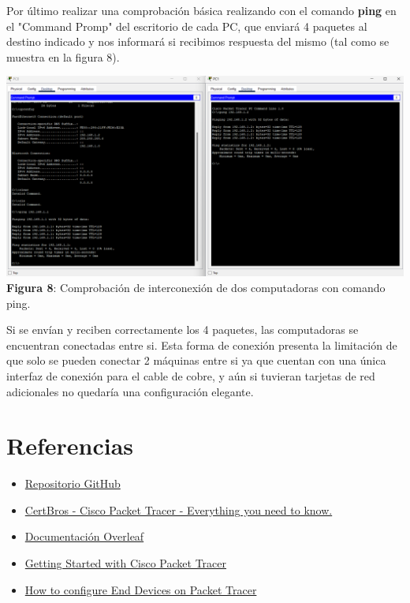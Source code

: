 \documentclass{article}
\begin{document}
    Por último realizar una comprobación básica realizando con el comando {\bfseries ping} en el "Command Promp" del escritorio de cada PC, que enviará 4 paquetes al destino indicado y nos informará si recibimos respuesta del mismo (tal como se muestra en la figura 8).
    \begin{center}
        \includegraphics[width=0.9\linewidth]{img_11} 
        \linebreak
        \small {\bfseries Figura 8}: Comprobación de interconexión de dos computadoras con comando ping.
    \end{center}
    Si se envían y reciben correctamente los 4 paquetes, las computadoras se encuentran conectadas entre si.\linebreak
    Esta forma de conexión presenta la limitación de que solo se pueden conectar 2 máquinas entre si ya que cuentan con una única interfaz de conexión para el cable de cobre, y aún si tuvieran tarjetas de red adicionales no quedaría una configuración elegante.
    
    \pagebreak
    \section{Referencias}
        \begin{itemize}
            \item \href{https://github.com/MarianC312/Introduccion_Packet_Tracer}{Repositorio GitHub}
            \item \href{https://www.youtube.com/watch?v=qZB_biPOBwA}{CertBros - Cisco Packet Tracer - Everything you need to know.}
            \item \href{https://www.overleaf.com/learn}{Documentación Overleaf}
            \item \href{https://www.netacad.com/courses/packet-tracer}{Getting Started with Cisco Packet Tracer}
            \item \href{https://www.geeksforgeeks.org/how-to-configure-end-devices-on-packet-tracer/}{How to configure End Devices on Packet Tracer}
        \end{itemize}
\end{document}
